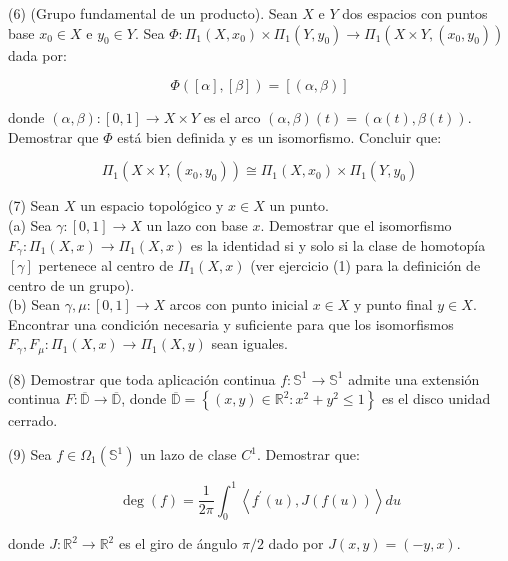 \documentclass[
  a4paper,
  spanish,
  12pt,
]{scrartcl}
\begin{document}
\begin{ejer}
(6) (Grupo fundamental de un producto). Sean $X$ e $Y$ dos espacios con puntos base $x_{0} \in X$ e $y_{0} \in Y$. Sea $\Phi: \Pi_{1}\left(X, x_{0}\right) \times \Pi_{1}\left(Y, y_{0}\right) \rightarrow \Pi_{1}\left(X \times Y,\left(x_{0}, y_{0}\right)\right)$ dada por:


$$
\Phi([\alpha],[\beta])=[(\alpha, \beta)]
$$

donde $(\alpha, \beta):[0,1] \rightarrow X \times Y$ es el arco $(\alpha, \beta)(t)=(\alpha(t), \beta(t))$. Demostrar que $\Phi$ está bien definida y es un isomorfismo. Concluir que:

$$
\Pi_{1}\left(X \times Y,\left(x_{0}, y_{0}\right)\right) \cong \Pi_{1}\left(X, x_{0}\right) \times \Pi_{1}\left(Y, y_{0}\right)
$$
\end{ejer}


\begin{ejer}
(7) Sean $X$ un espacio topológico y $x \in X$ un punto.\\
(a) Sea $\gamma:[0,1] \rightarrow X$ un lazo con base $x$. Demostrar que el isomorfismo $F_{\gamma}: \Pi_{1}(X, x) \rightarrow \Pi_{1}(X, x)$ es la identidad si y solo si la clase de homotopía $[\gamma]$ pertenece al centro de $\Pi_{1}(X, x)$ (ver ejercicio (1) para la definición de centro de un grupo).\\
(b) Sean $\gamma, \mu:[0,1] \rightarrow X$ arcos con punto inicial $x \in X$ y punto final $y \in X$. Encontrar una condición necesaria y suficiente para que los isomorfismos $F_{\gamma}, F_{\mu}: \Pi_{1}(X, x) \rightarrow \Pi_{1}(X, y)$ sean iguales.\\
\end{ejer}

\begin{ejer}
(8) Demostrar que toda aplicación continua $f: \mathbb{S}^{1} \rightarrow \mathbb{S}^{1}$ admite una extensión continua $F: \overline{\mathbb{D}} \rightarrow \overline{\mathbb{D}}$, donde $\overline{\mathbb{D}}=\left\{(x, y) \in \mathbb{R}^{2}: x^{2}+y^{2} \leq 1\right\}$ es el disco unidad cerrado.\\
\end{ejer}

\begin{ejer}
(9) Sea $f \in \Omega_{1}\left(\mathbb{S}^{1}\right)$ un lazo de clase $C^{1}$. Demostrar que:

$$
\operatorname{deg}(f)=\frac{1}{2 \pi} \int_{0}^{1}\left\langle f^{\prime}(u), J(f(u))\right\rangle d u
$$

donde $J: \mathbb{R}^{2} \rightarrow \mathbb{R}^{2}$ es el giro de ángulo $\pi / 2$ dado por $J(x, y)=(-y, x)$.\\
\end{ejer}
\end{document}
